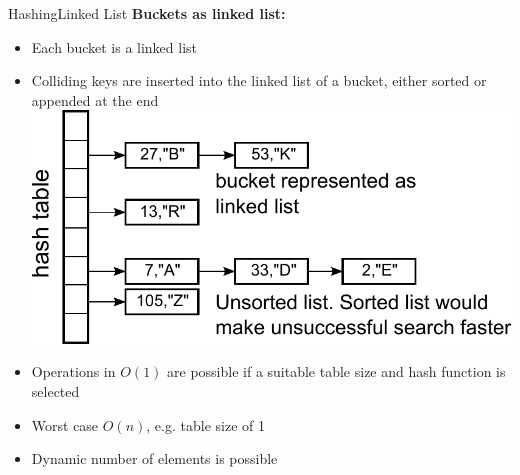 \begin{frame}{Hashing}{Linked List}
  \textbf{Buckets as linked list:}
  \begin{itemize}
    \item<2->
      Each bucket is a linked list
    \item<3->
      Colliding keys are inserted into the linked list of a bucket, either sorted or appended at the end
\includegraphics[height=0.35\textheight]{Images/hashtable-buckets.pdf}
   \item<5->
     Operations in {\color{MainA}$O(1)$} are possible if a suitable table size and hash function is
     selected
   \item<6->
     Worst case {\color{MainA}$O(n)$}, e.g. table size of 1
   \item<7->
     Dynamic number of elements is possible 
  \end{itemize}
\end{frame}

